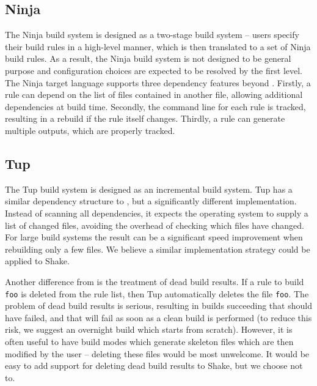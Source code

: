 \subsection{Ninja\label{sec:ninja}}


The Ninja build system \cite{ninja} is designed as a two-stage build system -- users specify their build rules in a high-level manner, which is then translated to a set of Ninja build rules. As a result, the Ninja build system is not designed to be general purpose and configuration choices are expected to be resolved by the first level. The Ninja target language supports three dependency features beyond \make{}. Firstly, a rule can depend on the list of files contained in another file, allowing additional dependencies at build time. Secondly, the command line for each rule is tracked, resulting in a rebuild if the rule itself changes. Thirdly, a rule can generate multiple outputs, which are properly tracked.

\subsection{Tup}


The Tup build system \cite{tup} is designed as an incremental build system. Tup has a similar dependency structure to \make{}, but a significantly different implementation. Instead of scanning all dependencies, it expects the operating system to supply a list of changed files, avoiding the overhead of checking which files have changed. For large build systems the result can be a significant speed improvement when rebuilding only a few files. We believe a similar implementation strategy could be applied to Shake.

Another difference from \make{} is the treatment of dead build results. If a rule to build \texttt{foo} is deleted from the rule list, then Tup automatically deletes the file \texttt{foo}. The problem of dead build results is serious, resulting in builds succeeding that should have failed, and that will fail as soon as a clean build is performed (to reduce this risk, we suggest an overnight build which starts from scratch). However, it is often useful to have build modes which generate skeleton files which are then modified by the user -- deleting these files would be most unwelcome. It would be easy to add support for deleting dead build results to Shake, but we choose not to.

